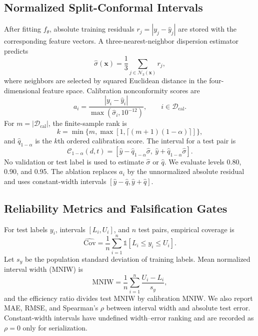 \documentclass[lettersize,journal]{IEEEtran}
\begin{document}
\subsection{Normalized Split-Conformal Intervals}
After fitting $f_\theta$, absolute training residuals $r_j=|y_j-\hat y_j|$ are stored with the corresponding feature vectors. A three-nearest-neighbor dispersion estimator predicts
\begin{equation}
\hat\sigma(\mathbf{x})=\frac{1}{3}\sum_{j\in\mathcal{N}_3(\mathbf{x})}r_j,
\end{equation}
where neighbors are selected by squared Euclidean distance in the four-dimensional feature space. Calibration nonconformity scores are
\begin{equation}
a_i=\frac{|y_i-\hat y_i|}{\max(\hat\sigma_i,10^{-12})},
\qquad i\in\mathcal{D}_{\mathrm{cal}}.
\end{equation}
For $m=|\mathcal{D}_{\mathrm{cal}}|$, the finite-sample rank is
\begin{equation}
k=\min\{m,\max[1,\lceil(m+1)(1-\alpha)\rceil]\},
\end{equation}
and $\hat q_{1-\alpha}$ is the $k$th ordered calibration score. The interval for a test pair is
\begin{equation}
\mathcal{C}_{1-\alpha}(d,t)=
[\hat y-\hat q_{1-\alpha}\hat\sigma,\
 \hat y+\hat q_{1-\alpha}\hat\sigma].
\end{equation}
No validation or test label is used to estimate $\hat\sigma$ or $\hat q$. We evaluate levels 0.80, 0.90, and 0.95. The ablation replaces $a_i$ by the unnormalized absolute residual and uses constant-width intervals $[\hat y-\hat q,\hat y+\hat q]$.

\subsection{Reliability Metrics and Falsification Gates}
For test labels $y_i$, intervals $[L_i,U_i]$, and $n$ test pairs, empirical coverage is
\begin{equation}
\widehat{\mathrm{Cov}}=\frac{1}{n}\sum_{i=1}^{n}\mathbb{1}[L_i\le y_i\le U_i].
\end{equation}
Let $s_y$ be the population standard deviation of training labels. Mean normalized interval width (MNIW) is
\begin{equation}
\mathrm{MNIW}=\frac{1}{n}\sum_{i=1}^{n}\frac{U_i-L_i}{s_y},
\end{equation}
and the efficiency ratio divides test MNIW by calibration MNIW. We also report MAE, RMSE, and Spearman's $\rho$ between interval width and absolute test error. Constant-width intervals have undefined width--error ranking and are recorded as $\rho=0$ only for serialization.
\end{document}
